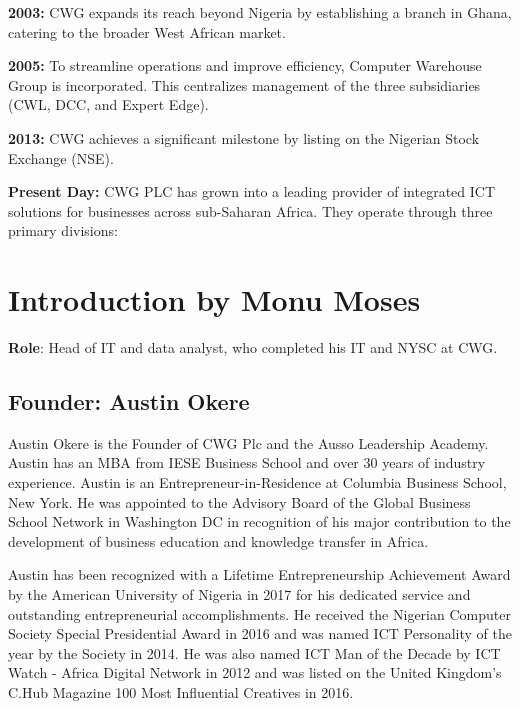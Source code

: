 \documentclass[a4paper,12pt]{report}
\begin{document}
	\vspace{\baselineskip}
	
	\textbf{2003:} CWG expands its reach beyond Nigeria by establishing a branch in Ghana, catering to the broader West African market.
	
	\vspace{\baselineskip}
	
	\textbf{2005: }To streamline operations and improve efficiency, Computer Warehouse Group is incorporated. This centralizes management of the three subsidiaries (CWL, DCC, and Expert Edge).
	
	\vspace{\baselineskip}
	
	\textbf{2013:} CWG achieves a significant milestone by listing on the Nigerian Stock Exchange (NSE).
	
	\vspace{\baselineskip}
	
	\textbf{Present Day:} CWG PLC has grown into a leading provider of integrated ICT solutions for businesses across sub-Saharan Africa. They operate through three primary divisions:
	
	
	\section{Introduction by Monu Moses}
	\textbf{Role}: Head of IT and data analyst, who completed his IT and NYSC at CWG.
	
	\subsection{Founder: Austin Okere}
	Austin Okere is the Founder of CWG Plc and the Ausso Leadership Academy. Austin has an MBA from IESE Business School and over 30 years of industry experience. Austin is an Entrepreneur-in-Residence at Columbia Business School, New York. He was appointed to the Advisory Board of the Global Business School Network in Washington DC in recognition of his major contribution to the development of business education and knowledge transfer in Africa.
	
	Austin has been recognized with a Lifetime Entrepreneurship Achievement Award by the American University of Nigeria in 2017 for his dedicated service and outstanding entrepreneurial accomplishments. He received the Nigerian Computer Society Special Presidential Award in 2016 and was named ICT Personality of the year by the Society in 2014. He was also named ICT Man of the Decade by ICT Watch - Africa Digital Network in 2012 and was listed on the United Kingdom’s C.Hub Magazine 100 Most Influential Creatives in 2016. 
	
\end{document}
